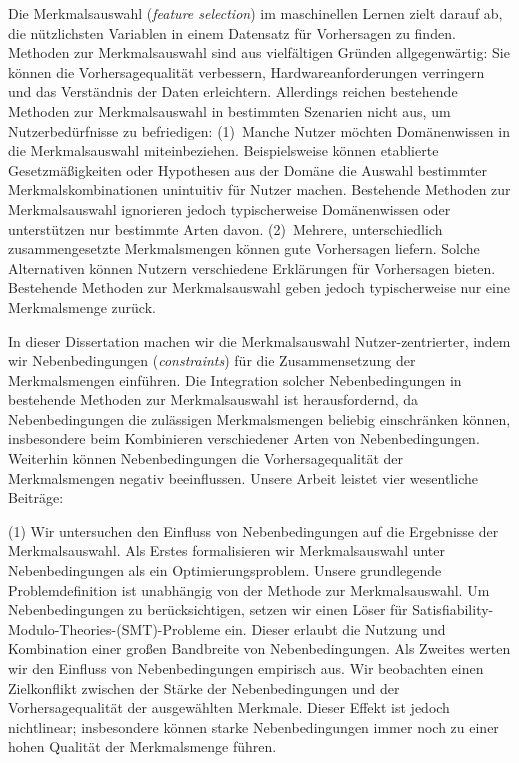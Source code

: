 Die Merkmalsauswahl (\emph{feature selection}) im maschinellen Lernen zielt darauf ab, die nützlichsten Variablen in einem Datensatz für Vorhersagen zu finden.
Methoden zur Merkmalsauswahl sind aus vielfältigen Gründen allgegenwärtig:
Sie können die Vorhersagequalität verbessern, Hardwareanforderungen verringern und das Verständnis der Daten erleichtern.
Allerdings reichen bestehende Methoden zur Merkmalsauswahl in bestimmten Szenarien nicht aus, um Nutzerbedürfnisse zu befriedigen:
(1)~Manche Nutzer möchten Domänenwissen in die Merkmalsauswahl miteinbeziehen.
Beispielsweise können etablierte Gesetzmäßigkeiten oder Hypothesen aus der Domäne die Auswahl bestimmter Merkmalskombinationen unintuitiv für Nutzer machen.
Bestehende Methoden zur Merkmalsauswahl ignorieren jedoch typischerweise Domänenwissen oder unterstützen nur bestimmte Arten davon.
(2)~Mehrere, unterschiedlich zusammengesetzte Merkmalsmengen können gute Vorhersagen liefern.
Solche Alternativen können Nutzern verschiedene Erklärungen für Vorhersagen bieten.
Bestehende Methoden zur Merkmalsauswahl geben jedoch typischerweise nur eine Merkmalsmenge zurück.

In dieser Dissertation machen wir die Merkmalsauswahl Nutzer-zentrierter, indem wir Nebenbedingungen (\emph{constraints}) für die Zusammensetzung der Merkmalsmengen einführen.
Die Integration solcher Nebenbedingungen in bestehende Methoden zur Merkmalsauswahl ist herausfordernd, da Nebenbedingungen die zulässigen Merkmalsmengen beliebig einschränken können, insbesondere beim Kombinieren verschiedener Arten von Nebenbedingungen.
Weiterhin können Nebenbedingungen die Vorhersagequalität der Merkmalsmengen negativ beeinflussen.
Unsere Arbeit leistet vier wesentliche Beiträge:

(1) Wir untersuchen den Einfluss von Nebenbedingungen auf die Ergebnisse der Merkmalsauswahl.
Als Erstes formalisieren wir Merkmalsauswahl unter Nebenbedingungen als ein Optimierungsproblem.
Unsere grundlegende Problemdefinition ist unabhängig von der Methode zur Merkmalsauswahl.
Um Nebenbedingungen zu berücksichtigen, setzen wir einen Löser für Satisfiability-Modulo-Theories-(SMT)-Probleme ein.
Dieser erlaubt die Nutzung und Kombination einer großen Bandbreite von Nebenbedingungen.
Als Zweites werten wir den Einfluss von Nebenbedingungen empirisch aus.
Wir beobachten einen Zielkonflikt zwischen der Stärke der Nebenbedingungen und der Vorhersagequalität der ausgewählten Merkmale.
Dieser Effekt ist jedoch nichtlinear; insbesondere können starke Nebenbedingungen immer noch zu einer hohen Qualität der Merkmalsmenge führen.

